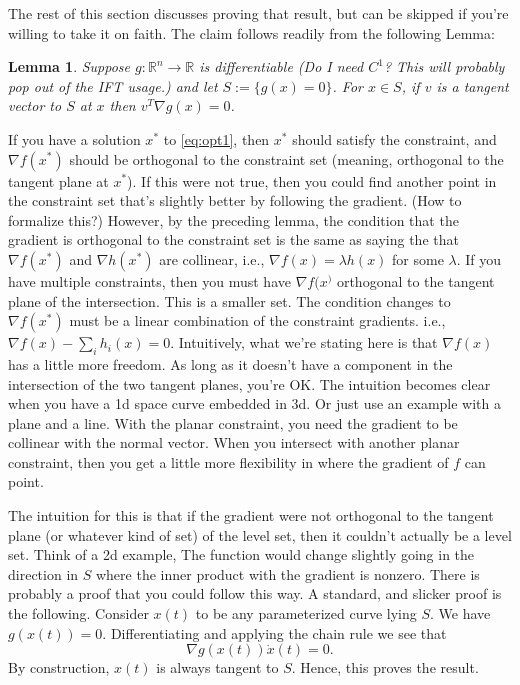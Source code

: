\documentclass{book}
\newtheorem{lemma}{Lemma}
\newcommand{\R}{\mathbb{R}}
\begin{document}
The rest of this section discusses proving that result, but can be skipped if you're willing to take it on faith. The claim follows readily from the following Lemma:
\begin{lemma}
Suppose $g: \R^n\to \R$ is differentiable (Do I need $C^1$? This will probably pop out of the IFT usage.) and let $S := \{g(x) = 0\}$. For $x\in S$, if $v$ is a tangent vector to $S$ at $x$ then $v^T \nabla g(x) = 0$. 
\end{lemma}
If you have a solution $x^*$ to \eqref{eq:opt1}, then $x^*$ should satisfy the constraint, and $\nabla f(x^*)$ should be orthogonal to the constraint set (meaning, orthogonal to the tangent plane at $x^*$). If this were not true, then you could find another point in the constraint set that's slightly better by following the gradient. (How to formalize this?) However, by the preceding lemma, the condition that the gradient is orthogonal to the constraint set is the same as saying the that $\nabla f(x^*)$ and $\nabla h(x^*)$ are collinear, i.e., $\nabla f(x) = \lambda h(x)$ for some $\lambda$. If you have multiple constraints, then you must have $\nabla f(x^)$ orthogonal to the tangent plane of the intersection. This is a smaller set. The condition changes to $\nabla f(x^*)$ must be a linear combination of the constraint gradients. i.e., $\nabla f(x) - \sum_i h_i(x) = 0$. Intuitively, what we're stating here is that $\nabla f(x)$ has a little more freedom. As long as it doesn't have a component in the intersection of the two tangent planes, you're OK. The intuition becomes clear when you have a 1d space curve embedded in 3d. Or just use an example with a plane and a line. With the planar constraint, you need the gradient to be collinear with the normal vector. When you intersect with another planar constraint, then you get a little more flexibility in where the gradient of $f$ can point. 

The intuition for this is that if the gradient were not orthogonal to the tangent plane (or whatever kind of set) of the level set, then it couldn't actually be a level set. Think of a 2d example, The function would change slightly going in the direction in $S$ where the inner product with the gradient is nonzero. There is probably a proof that you could follow this way. A standard, and slicker proof is the following. Consider $x(t)$ to be any parameterized curve lying $S$. We have $g(x(t)) = 0$. Differentiating and applying the chain rule we see that 
$$
\nabla g(x(t)) \dot x(t) = 0.
$$ 
By construction, $x(t)$ is always tangent to $S$. Hence, this proves the result. 
\end{document}
